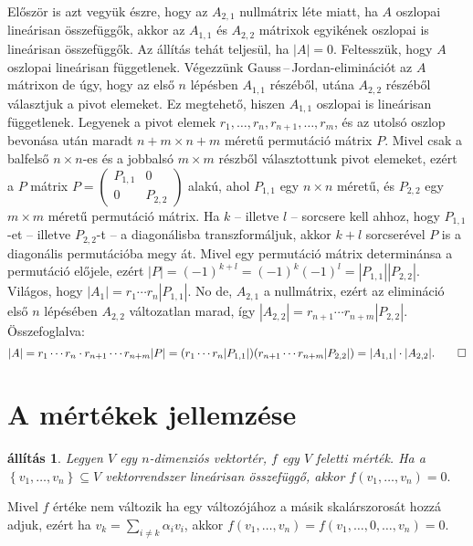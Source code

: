 \documentclass[9pt, a4paper, showtrims]{memoir}
\makeatletter
\renewenvironment{proof}[1][\proofname]
    {\par\pushQED{\qed}%
    \normalfont \topsep6\p@\@plus6\p@\relax
    \trivlist
    \item[\hskip\labelsep
        \itshape
    #1\@addpunct{:}]\ignorespaces}
    {\popQED\endtrivlist\@endpefalse}
\theoremstyle{plain}
\newtheorem{proposition}{állítás}[chapter]
\theoremstyle{remark}
\theoremstyle{definition}
\makeatother
\begin{document}
\begin{proof}[Gauss\,--\,Jordan-elimináció alapján]
	Először is azt vegyük észre, hogy az $A_{2,1}$ nullmátrix léte miatt,
	ha $A$ oszlopai lineárisan összefüggők,
	akkor az $A_{1,1}$ és $A_{2,2}$ mátrixok egyikének oszlopai is lineárisan összefüggők.
	Az állítás tehát teljesül, ha $|A|=0$.
	Feltesszük, hogy $A$ oszlopai lineárisan függetlenek.
	Végezzünk Gauss\,--\,Jordan-eliminációt az $A$ mátrixon de úgy,
	hogy az első $n$ lépésben $A_{1,1}$ részéből, utána $A_{2,2}$ részéből választjuk a pivot elemeket.
	Ez megtehető, hiszen $A_{1,1}$ oszlopai is lineárisan függetlenek.
	Legyenek a pivot elemek $r_1,\ldots,r_n,r_{n+1},\ldots,r_m$,
	és az utolsó oszlop bevonása után maradt $n+m\times n+m$ méretű permutáció mátrix $P$.
	Mivel csak a balfelső $n\times n$-es és a jobbalsó $m\times m$ részből választottunk pivot elemeket,
	ezért a $P$ mátrix
	\begin{math}
		P=
		\begin{pmatrix}
			P_{1,1} & 0       \\
			0       & P_{2,2}
		\end{pmatrix}
	\end{math}
	alakú, ahol $P_{1,1}$ egy $n\times n$ méretű,
	és $P_{2,2}$ egy $m\times m$ méretű permutáció mátrix.
	Ha $k$ -- illetve $l$ -- sorcsere kell ahhoz,
	hogy $P_{1,1}$-et -- illetve $P_{2,2}$-t -- a diagonálisba transzformáljuk,
	akkor $k+l$ sorcserével $P$ is a diagonális permutációba megy át.
	Mivel egy permutáció mátrix determinánsa a permutáció előjele, ezért
	\(
	|P|=(-1)^{k+l}=\left( -1 \right)^k\left( -1 \right)^l=|P_{1,1}||P_{2,2}|.
	\)
	Világos, hogy $|A_1|=r_1\cdots r_n|P_{1,1}|$.
	No de, $A_{2,1}$ a nullmátrix, ezért az elimináció első $n$ lépésében $A_{2,2}$ változatlan marad,
	így $|A_{2,2}|=r_{n+1}\cdots r_{n+m}|P_{2,2}|$.
	Összefoglalva:
	\[
		|A|
		=r_1\cdots r_n\cdot r_{n+1}\cdots r_{n+m}|P|
		=(r_1\cdots r_n|P_{1,1}|)(r_{n+1}\cdots r_{n+m}|P_{2,2}|)
		=|A_{1,1}|\cdot|A_{2,2}|.\qedhere
	\]
\end{proof}

\section{A mértékek jellemzése}

\begin{proposition}
	Legyen $V$ egy $n$-dimenziós vektortér, $f$ egy $V$ feletti mérték.
	Ha a $\left\{ v_{1},\ldots ,v_{n}\right\} \subseteq V$ vektorrendszer lineárisan összefüggő,
	akkor
	\(
	f\left( v_{1},\ldots ,v_{n}\right) =0.
	\)
\end{proposition}
\begin{proof}
	Mivel $f$ értéke nem változik ha egy változójához a másik skalárszorosát hozzá adjuk,
	ezért ha $v_{k}=\sum_{i\neq k}\alpha _{i}v_{i}$,
	akkor
	$f\left(v_{1},\ldots ,v_{n}\right)
		=
		f\left( v_{1},\ldots ,0,\ldots ,v_{n}\right)
		=
		0$.
\end{proof}
\end{document}
